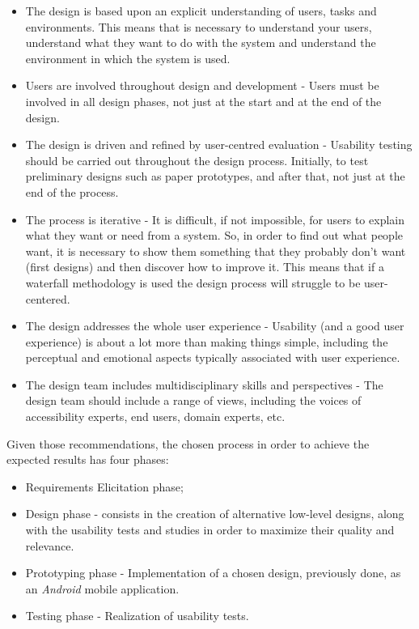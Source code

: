 \begin{itemize}
\item The design is based upon an explicit understanding of users, tasks and environments. This means that is necessary to understand your users, understand what they want to do with the system and understand the environment in which the system is used.

\item Users are involved throughout design and development - Users must be involved in all design phases, not just at the start and at the end of the design.

\item The design is driven and refined by user-centred evaluation - Usability testing should be carried out throughout the design process. Initially, to test preliminary designs such as paper prototypes, and after that, not just at the end of the process.

\item The process is iterative - It is difficult, if not impossible, for users to explain what they want or need from a system. So, in order to find out what people want, it is necessary to show them something that they probably don't want (first designs) and then discover how to improve it. This means that if a waterfall methodology is used the design process will struggle to be user-centered.

\item The design addresses the whole user experience - Usability (and a good user experience) is about a lot more than making things simple, including the perceptual and emotional aspects typically associated with user experience.

\item The design team includes multidisciplinary skills and perspectives - The design team should include a range of views, including the voices of accessibility experts, end users, domain experts, etc.
\end{itemize}

Given those recommendations, the chosen process in order to achieve the expected results has four phases: 

\begin{itemize}
\item Requirements Elicitation phase;
\item Design phase - consists in the creation of alternative low-level designs, along with the usability tests and studies in order to maximize their quality and relevance.
\item Prototyping phase - Implementation of a chosen design, previously done, as an \emph{Android} mobile application.
\item Testing phase - Realization of usability tests.
\end{itemize}

